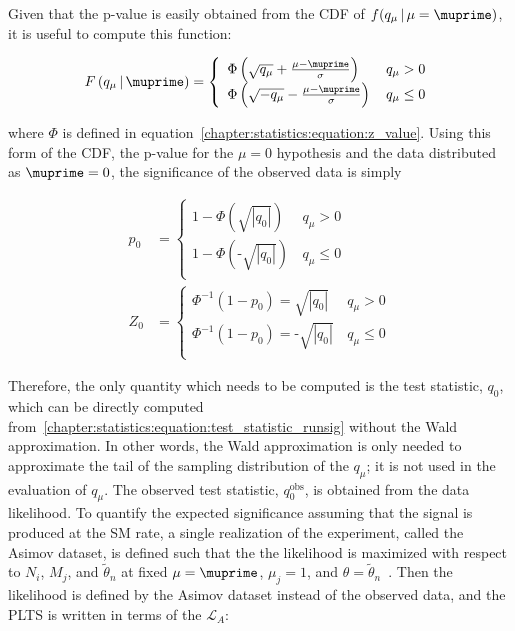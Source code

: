 Given that the p-value is easily obtained from the CDF of $f(q_{\mu}\,|\,\mu =
\muprime)$, it is useful to compute this function:

\begin{equation}
F\left(q_{\mu}\,|\, \muprime\right) = \left\{
\begin{array}{ll}
\Phi\left(\sqrt{q_{\mu}} + \frac{\mu - \muprime}{\sigma}\right) & \, q_{\mu} > 0 \\
\Phi\left(\sqrt{-q_{\mu}} - \frac{\mu - \muprime}{\sigma}\right) & \,
q_{\mu} \leq 0
\end{array}
\right.
\label{chapter:statistics:equation:cdf_qmu}
\end{equation}

\noindent
where $\Phi$ is defined in
equation~\ref{chapter:statistics:equation:z_value}. Using this form of
the CDF, the p-value for the $\mu=0$ hypothesis and
the data distributed as $\muprime = 0$, the significance of the
observed data is simply

\begin{equation}
\begin{aligned}
p_0 &= \left\{
\begin{array}{ll}
1 - \Phi\left(\sqrt{|q_0|}\right) & \, q_{\mu} > 0 \\
1 - \Phi\left(\textrm{-}\sqrt{|q_0|}\right) & \, q_{\mu} \leq 0 \\
\end{array}
\right. \\
Z_0 &= \left\{
\begin{array}{ll}
\Phi^{-1}\left(1-p_0\right) = \sqrt{|q_0|} & \, q_{\mu} > 0 \\
\Phi^{-1}\left(1-p_0\right) = \textrm{-}\sqrt{|q_0|} & \, q_{\mu} \leq 0 \\
\end{array}
\right.
\label{chapter:statistics:equation:signif_discovery}
\end{aligned}
\end{equation}

\noindent
Therefore, the only quantity which needs to be computed is the test
statistic, $q_0$, which can be directly computed
from~\ref{chapter:statistics:equation:test_statistic_runsig} without the Wald
approximation. In other words, the Wald approximation is only needed
to approximate the tail of the sampling distribution of the $q_{\mu}$;
it is not used in the evaluation of $q_{\mu}$. The observed test statistic,
$q_0^{\textrm{obs}}$, is obtained from the data likelihood. To quantify
the expected significance assuming that the signal
is produced at the SM rate, a single realization of the experiment,
called the Asimov dataset, is defined such that
the the likelihood is maximized with respect to $N_i$, $M_j$, and
$\tilde{\theta}_n$ at fixed $\mu = \muprime$, $\mu_j = 1$, and $\theta
= \tilde{\theta}_n$~\cite{bib:Cowan:2010js}. Then the likelihood is defined by the
Asimov dataset instead of the observed data, and the PLTS is written in terms of the $\mathscr{L}_A$:

